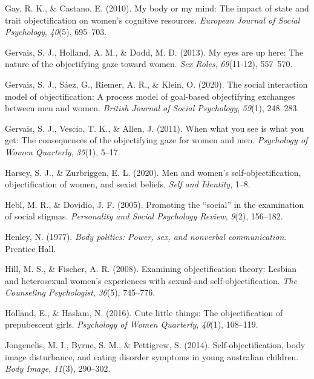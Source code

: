 \documentclass[man]{apa6}
\begin{document}
\hypertarget{ref-gay2010my}{}
Gay, R. K., \& Castano, E. (2010). My body or my mind: The impact of
state and trait objectification on women's cognitive resources.
\emph{European Journal of Social Psychology}, \emph{40}(5), 695--703.

\hypertarget{ref-gervais2013my}{}
Gervais, S. J., Holland, A. M., \& Dodd, M. D. (2013). My eyes are up
here: The nature of the objectifying gaze toward women. \emph{Sex
Roles}, \emph{69}(11-12), 557--570.

\hypertarget{ref-gervais2020social}{}
Gervais, S. J., Sáez, G., Riemer, A. R., \& Klein, O. (2020). The social
interaction model of objectification: A process model of goal-based
objectifying exchanges between men and women. \emph{British Journal of
Social Psychology}, \emph{59}(1), 248--283.

\hypertarget{ref-gervais2011you}{}
Gervais, S. J., Vescio, T. K., \& Allen, J. (2011). When what you see is
what you get: The consequences of the objectifying gaze for women and
men. \emph{Psychology of Women Quarterly}, \emph{35}(1), 5--17.

\hypertarget{ref-harsey2020men}{}
Harsey, S. J., \& Zurbriggen, E. L. (2020). Men and women's
self-objectification, objectification of women, and sexist beliefs.
\emph{Self and Identity}, 1--8.

\hypertarget{ref-hebl2005promoting}{}
Hebl, M. R., \& Dovidio, J. F. (2005). Promoting the ``social'' in the
examination of social stigmas. \emph{Personality and Social Psychology
Review}, \emph{9}(2), 156--182.

\hypertarget{ref-henley1977body}{}
Henley, N. (1977). \emph{Body politics: Power, sex, and nonverbal
communication}. Prentice Hall.

\hypertarget{ref-hill2008examining}{}
Hill, M. S., \& Fischer, A. R. (2008). Examining objectification theory:
Lesbian and heterosexual women's experiences with sexual-and
self-objectification. \emph{The Counseling Psychologist}, \emph{36}(5),
745--776.

\hypertarget{ref-holland2016}{}
Holland, E., \& Haslam, N. (2016). Cute little things: The
objectification of prepubescent girls. \emph{Psychology of Women
Quarterly}, \emph{40}(1), 108--119.

\hypertarget{ref-jongenelis2014}{}
Jongenelis, M. I., Byrne, S. M., \& Pettigrew, S. (2014).
Self-objectification, body image disturbance, and eating disorder
symptoms in young australian children. \emph{Body Image}, \emph{11}(3),
290--302.
\end{document}
